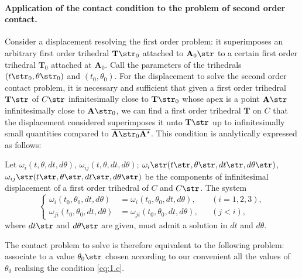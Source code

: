 \paragraph{Application of the contact condition to the problem of second order contact.}
\label{sec:17}
Consider a displacement resolving the first order problem: it superimposes an arbitrary first order trihedral $\mathbf{T}\str_{0}$ attached to $\mathbf{A}_{0}\str$ to a certain first order trihedral $\mathbf{T}_{0}$ attached at $\mathbf{A}_{0}$. Call the parameters of the trihedrals $(t\str_{0},\theta\str_{0})$ and $(t_{0},\theta_{0})$. For the displacement to solve the second order contact problem, it is necessary and sufficient that given a first order trihedral $\mathbf{T}\str$ of $C\str$ infinitesimally close to $\mathbf{T}\str_{0}$ whose apex is a point $\mathbf{A}\str$ infinitesimally close to $\mathbf{A}\str_{0}$, we can find a first order trihedral $\mathbf{T}$ on $C$ that the displacement considered superimposes it unto $\mathbf{T}\str$ up to infinitesimally small quantities compared to $\overline{\mathbf{A}\str_{0}\mathbf{A}_{\vphantom{0}}^{\star}}$. This condition is analytically expressed as follows:

\somespace

Let $\omega_{i}(t,\theta,dt,d\theta)$, $\omega_{ij}(t,\theta,dt,d\theta)$; $\omega_{i}\str(t\str,\theta\str,dt\str,d\theta\str)$, $\omega_{ij}\str(t\str,\theta\str,dt\str,d\theta\str)$ be the components of infinitesimal displacement  of a first order trihedral of $C$ and $C\str$. The system
\begin{equation}
  \label{eq:1.c}\tag{$c$}
  \left\{
    \begin{aligned}
      \omega_{i}(t_{0},\theta_{0},dt,d\theta)&=\omega_{i}(t_{0},\theta_{0},dt,d\theta),&&(i=1,2,3),\\
      \omega_{ji}(t_{0},\theta_{0},dt,d\theta)&=\omega_{ji}(t_{0},\theta_{0},dt,d\theta),&&(j<i),
    \end{aligned}
  \right.
\end{equation}
where $dt\str$ and $d\theta\str$ are given, must admit a solution in $dt$ and $d\theta$.

\somespace

The contact problem to solve is therefore equivalent to the following problem: associate to a value $\theta_{0}\str$ chosen according to our convenient all the values of $\theta_{0}$ realising the condition \eqref{eq:1.c}.

